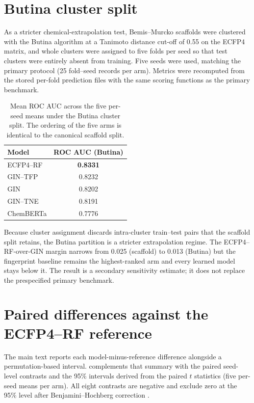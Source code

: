 \documentclass[11pt,a4paper]{article}
\begin{document}
\section{Butina cluster split}
\label{sec:butina_si}

As a stricter chemical-extrapolation test, Bemis--Murcko scaffolds \citep{bemis_murcko_1996} were clustered with the Butina algorithm \citep{butina1999} at a Tanimoto distance cut-off of \num{0.55} on the ECFP4 matrix, and whole clusters were assigned to five folds per seed so that test clusters were entirely absent from training. Five seeds were used, matching the primary protocol (\num{25} fold--seed records per arm). Metrics were recomputed from the stored per-fold prediction files with the same scoring functions as the primary benchmark.

\begin{table}[h]
\centering
\caption{Mean ROC AUC across the five per-seed means under the Butina cluster split. The ordering of the five arms is identical to the canonical scaffold split.}
\label{tab:s5_butina}
\begin{tabular}{lc}
\toprule
Model & ROC AUC (Butina) \\
\midrule
ECFP4--RF & \textbf{\num{0.8331}} \\
GIN--TFP & \num{0.8232} \\
GIN & \num{0.8202} \\
GIN--TNE & \num{0.8191} \\
ChemBERTa & \num{0.7776} \\
\bottomrule
\end{tabular}
\end{table}

Because cluster assignment discards intra-cluster train--test pairs that the scaffold split retains, the Butina partition is a stricter extrapolation regime. The ECFP4--RF-over-GIN margin narrows from \num{0.025} (scaffold) to \num{0.013} (Butina) but the fingerprint baseline remains the highest-ranked arm and every learned model stays below it. The result is a secondary sensitivity estimate; it does not replace the prespecified primary benchmark.

\section{Paired differences against the ECFP4--RF reference}
\label{sec:paired_ci_si}

The main text reports each model-minus-reference difference alongside a permutation-based interval.  complements that summary with the paired seed-level contrasts and the 95\% intervals derived from the paired $t$ statistics (five per-seed means per arm). All eight contrasts are negative and exclude zero at the 95\% level after Benjamini--Hochberg correction \citep{benjamini1995}.
\end{document}
